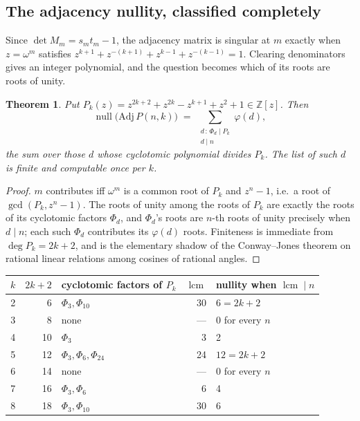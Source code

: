 \documentclass[11pt]{article}
\newtheorem{theorem}{Theorem}
\theoremstyle{definition}
\begin{document}
\subsection*{The adjacency nullity, classified completely}
Since $\det M_m=s_mt_m-1$, the adjacency matrix is singular at $m$ exactly when
$z=\omega^m$ satisfies $z^{k+1}+z^{-(k+1)}+z^{k-1}+z^{-(k-1)}=1$. Clearing
denominators gives an integer polynomial, and the question becomes which of its
roots are roots of unity.

\begin{theorem}\label{thm:adjclass}
Put $P_k(z)=z^{2k+2}+z^{2k}-z^{k+1}+z^{2}+1\in\mathbb Z[z]$. Then
\[
  \operatorname{null}\big(\mathrm{Adj}\,P(n,k)\big)
   \;=\; \sum_{\substack{d\,:\,\Phi_d\mid P_k\\ d\mid n}} \varphi(d),
\]
the sum over those $d$ whose cyclotomic polynomial divides $P_k$. The list of
such $d$ is finite and computable once per $k$.
\end{theorem}

\begin{proof}
$m$ contributes iff $\omega^m$ is a common root of $P_k$ and $z^n-1$, i.e.\ a
root of $\gcd(P_k,z^n-1)$. The roots of unity among the roots of $P_k$ are
exactly the roots of its cyclotomic factors $\Phi_d$, and $\Phi_d$'s roots are
$n$-th roots of unity precisely when $d\mid n$; each such $\Phi_d$ contributes
its $\varphi(d)$ roots. Finiteness is immediate from $\deg P_k=2k+2$, and is
the elementary shadow of the Conway--Jones theorem on rational linear relations
among cosines of rational angles.
\end{proof}

\begin{center}\small
\begin{tabular}{crlrl}
\toprule
$k$ & $2k+2$ & cyclotomic factors of $P_k$ & $\operatorname{lcm}$ & nullity when $\operatorname{lcm}\mid n$\\
\midrule
2 & 6  & $\Phi_3,\Phi_{10}$          & 30 & $6=2k+2$\\
3 & 8  & none                        & --- & $0$ for every $n$\\
4 & 10 & $\Phi_3$                    & 3  & 2\\
5 & 12 & $\Phi_3,\Phi_6,\Phi_{24}$   & 24 & $12=2k+2$\\
6 & 14 & none                        & --- & $0$ for every $n$\\
7 & 16 & $\Phi_3,\Phi_6$             & 6  & 4\\
8 & 18 & $\Phi_3,\Phi_{10}$          & 30 & 6\\
\bottomrule
\end{tabular}
\end{center}
\end{document}

